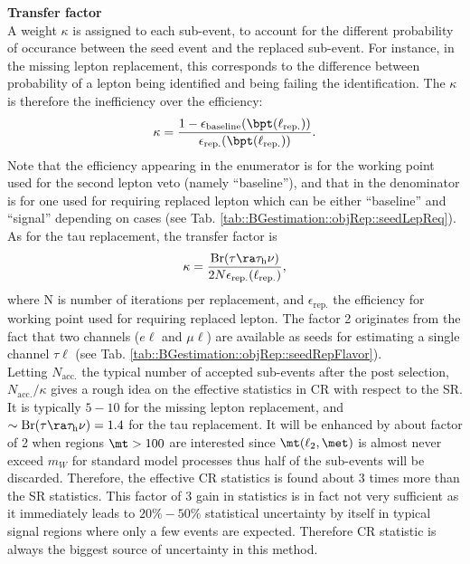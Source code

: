 
\noindent \textbf{Transfer factor} \\
A weight $\kappa$ is assigned to each sub-event, to account for the different probability of occurance between the seed event and the replaced sub-event. For instance, in the missing lepton replacement, this corresponds to the difference between probability of a lepton being identified and being failing the identification. The $\kappa$ is therefore the inefficiency over the efficiency:
$$
\kappa = \frac{
  1-\epsilon_{\mathrm{baseline}}  (\bpt(\ell_{\mathrm{rep.}}))
}{
  \epsilon_{\mathrm{rep.}} (\bpt(\ell_{\mathrm{rep.}}))
}.
$$
Note that the efficiency appearing in the enumerator is for the working point used for the second lepton veto (namely ``baseline''), and that in the denominator is for one used for requiring replaced lepton which can be either ``baseline'' and ``signal'' depending on cases (see Tab. \ref{tab::BGestimation::objRep::seedLepReq}). \\

As for the tau replacement, the transfer factor is 
$$
\kappa = \frac{
  \mathrm{Br}(\tau\ra\tau_{\mathrm{h}}\nu)
}{
  2N\epsilon_{\mathrm{rep.}}(\ell_{\mathrm{rep.}})
},
$$
where N is number of iterations per replacement, and $\epsilon_{\mathrm{rep.}}$ the efficiency for working point used for requiring replaced lepton. The factor 2 originates from the fact that two channels ($e\ell$ and $\mu\ell$) are available as seeds for estimating a single channel $\tau\ell$ (see Tab. \ref{tab::BGestimation::objRep::seedRepFlavor}). \\

Letting $N_{\mathrm{acc.}}$ the typical number of accepted sub-events after the post selection, $N_{\mathrm{acc.}}/\kappa$ gives a rough idea on the effective statistics in CR with respect to the SR. It is typically $5-10$ for the missing lepton replacement, and $\sim \mathrm{Br}(\tau\ra\tau_{\mathrm{h}}\nu) = 1.4$ for the tau replacement. It will be enhanced by about factor of 2 when regions $\mt>100$ are interested since $\mt(\ell_{2},\met)$ is almost never exceed $m_W$ for standard model processes thus half of the sub-events will be discarded. Therefore, the effective CR statistics is found about 3 times more than the SR statistics. This factor of 3 gain in statistics is in fact not very sufficient as it immediately leads to $20\%-50\%$ statistical uncertainty by itself in typical signal regions where only a few events are expected. Therefore CR statistic is always the biggest source of uncertainty in this method. \\


